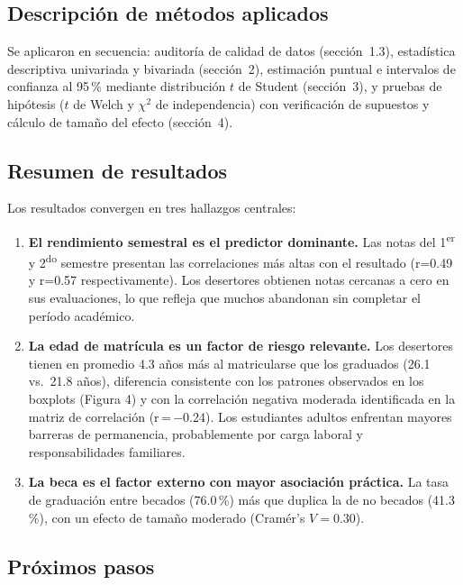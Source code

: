 \documentclass[11pt,a4paper]{article}
\begin{document}
\subsection{Descripción de métodos aplicados}

Se aplicaron en secuencia: auditoría de calidad de datos (sección~1.3),
estadística descriptiva univariada y bivariada (sección~2), estimación
puntual e intervalos de confianza al 95\,\% mediante distribución
$t$ de Student (sección~3), y pruebas de hipótesis  ($t$ de Welch y
$\chi^2$ de independencia) con verificación de supuestos y cálculo de tamaño del efecto (sección~4).


\subsection{Resumen de resultados}

Los resultados convergen en tres hallazgos centrales:

\begin{enumerate}
    \item \textbf{El rendimiento semestral es el predictor dominante.} Las notas del 1\textsuperscript{er} y 2\textsuperscript{do} semestre presentan las correlaciones más altas con el resultado (r=0.49 y r=0.57 respectivamente). Los desertores obtienen notas cercanas a cero en sus evaluaciones, lo que refleja que muchos abandonan sin completar el período académico.
    \item \textbf{La edad de matrícula es un factor de riesgo relevante.} Los desertores tienen en promedio 4.3 años más al matricularse que 
    los graduados (26.1 vs.\ 21.8 años), diferencia consistente con los patrones observados en los boxplots (Figura 4) y con la correlación negativa moderada identificada en la matriz de correlación 
(r\,=\,$-$0.24). Los estudiantes adultos enfrentan mayores barreras de permanencia, probablemente por carga laboral y responsabilidades familiares.
    \item \textbf{La beca es el factor externo con mayor asociación práctica.} La tasa de graduación entre becados (76.0\,\%) más que duplica la de no becados (41.3\,\%), con un efecto de tamaño moderado (Cramér's $V=0.30$).
\end{enumerate}


\subsection{Próximos pasos}
\end{document}
